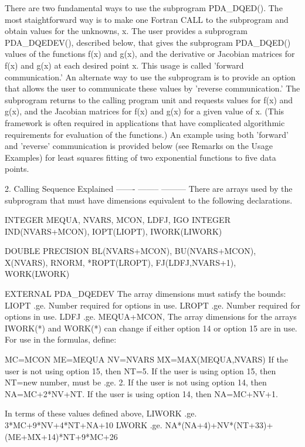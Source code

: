 \documentclass[11pt,twoside,nolof]{starlink}
\begin{document}
\begin{terminalv}
  There  are  two  fundamental  ways to use the subprogram PDA_DQED().
  The  most  staightforward way is to make one Fortran CALL to the
  subprogram  and  obtain  values  for  the unknowns, x.  The user
  provides  a subprogram PDA_DQEDEV(), described below, that gives the
  subprogram PDA_DQED() values of the functions f(x) and g(x), and the
  derivative  or  Jacobian  matrices  for  f(x)  and  g(x) at each
  desired  point x.  This usage is called 'forward communication.'
  An  alternate  way to use the subprogram is to provide an option
  that  allows  the  user  to communicate these values by 'reverse
  communication.'   The  subprogram returns to the calling program
  unit  and  requests  values  for f(x) and g(x), and the Jacobian
  matrices  for  f(x)  and  g(x)  for  a  given value of x.  (This
  framework   is   often   required   in  applications  that  have
  complicated  algorithmic  requirements  for  evaluation  of  the
  functions.)   An  example  using  both  'forward'  and 'reverse'
  communication  is  provided  below  (see  Remarks  on  the Usage
  Examples) for least squares fitting of two exponential functions
  to five data points.

  2. Calling Sequence Explained
     ------- -------- ---------
  There   are  arrays  used  by  the  subprogram  that  must  have
  dimensions equivalent to the following declarations.

        INTEGER MEQUA, NVARS, MCON, LDFJ, IGO
        INTEGER IND(NVARS+MCON), IOPT(LIOPT), IWORK(LIWORK)

        DOUBLE PRECISION BL(NVARS+MCON), BU(NVARS+MCON), X(NVARS), RNORM,
       *ROPT(LROPT), FJ(LDFJ,NVARS+1), WORK(LWORK)

        EXTERNAL PDA_DQEDEV
  The array dimensions must satisfy the bounds:
        LIOPT .ge.  Number required for options in use.
        LROPT .ge. Number required for options in use.
         LDFJ .ge. MEQUA+MCON,
  The  array  dimensions  for  the arrays IWORK(*) and WORK(*) can
  change  if either option 14 or option 15 are in use.  For use in
  the formulas, define:

       MC=MCON
       ME=MEQUA
       NV=NVARS
       MX=MAX(MEQUA,NVARS)
  If the user is not using option 15, then
       NT=5.
  If the user is using option 15, then
       NT=new number, must be .ge. 2.
  If the user is not using option 14, then
       NA=MC+2*NV+NT.
  If the user is using option 14, then
       NA=MC+NV+1.


  In terms of these values defined above,
        LIWORK .ge. 3*MC+9*NV+4*NT+NA+10
         LWORK .ge. NA*(NA+4)+NV*(NT+33)+(ME+MX+14)*NT+9*MC+26


\end{terminalv}
\end{document}

